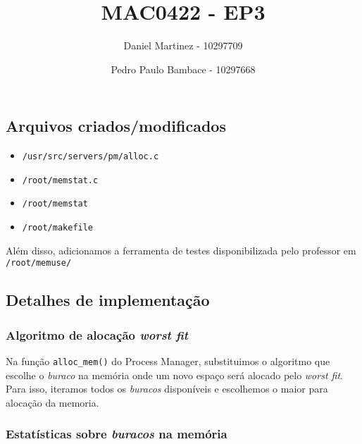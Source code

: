 \documentclass[]{article}
\date{}
\providecommand{\tightlist}{%
  \setlength{\itemsep}{0pt}\setlength{\parskip}{0pt}}
\begin{document}
\title{\textbf{MAC0422 - EP3}}
\author{Daniel Martinez - 10297709 
  \and Pedro Paulo Bambace - 10297668}

\maketitle

\hypertarget{arquivos-criadosmodificados}{%
\subsection{Arquivos
criados/modificados}\label{arquivos-criadosmodificados}}

\begin{itemize}
\tightlist
\item
  \texttt{/usr/src/servers/pm/alloc.c}
\item
  \texttt{/root/memstat.c}
\item
  \texttt{/root/memstat}
\item
  \texttt{/root/makefile}
\end{itemize}

Além disso, adicionamos a ferramenta de testes disponibilizada pelo
professor em \texttt{/root/memuse/}

\hypertarget{detalhes-de-implementauxe7uxe3o}{%
\subsection{Detalhes de
implementação}\label{detalhes-de-implementauxe7uxe3o}}

\hypertarget{algoritmo-de-alocauxe7uxe3o-worst-fit}{%
\subsubsection{\texorpdfstring{Algoritmo de alocação \emph{worst
fit}}{Algoritmo de alocação worst fit}}\label{algoritmo-de-alocauxe7uxe3o-worst-fit}}

Na função \texttt{alloc\_mem()} do Process Manager, substituimos o
algoritmo que escolhe o \emph{buraco} na memória onde um novo espaço
será alocado pelo \emph{worst fit}. Para isso, iteramos todos os
\emph{buracos} disponíveis e escolhemos o maior para alocação da
memoria.

\hypertarget{estatuxedsticas-sobre-buracos-na-memuxf3ria}{%
\subsubsection{\texorpdfstring{Estatísticas sobre \emph{buracos} na
memória}{Estatísticas sobre buracos na memória}}\label{estatuxedsticas-sobre-buracos-na-memuxf3ria}}
\end{document}
